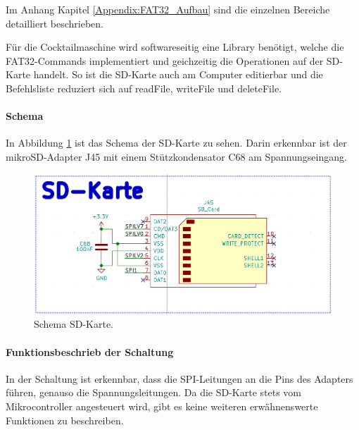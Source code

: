 Im Anhang Kapitel \ref{Appendix:FAT32_Aufbau} sind die einzelnen Bereiche detailliert beschrieben.

Für die Cocktailmaschine wird softwareseitig eine Library benötigt, welche die FAT32-Commands implementiert und geichzeitig die Operationen auf der SD-Karte handelt. So ist die SD-Karte auch am Computer editierbar und die Befehlsliste reduziert sich auf readFile, writeFile und deleteFile.

\paragraph{Schema}\mbox{}

In Abbildung \ref{fig:Schema_SD_Karte} ist das Schema der SD-Karte zu sehen. Darin erkennbar ist der mikroSD-Adapter J45 mit einem Stützkondensator C68 am Spannungseingang.

\begin{figure}[H]
\center
\includegraphics[width = 0.6 \textwidth]{graphics/Schema_SD_Karte}
\caption{Schema SD-Karte.}
\label{fig:Schema_SD_Karte}
\end{figure}

\paragraph{Funktionsbeschrieb der Schaltung}\mbox{}

In der Schaltung ist erkennbar, dass die SPI-Leitungen an die Pins des Adapters führen, genauso die Spannungsleitungen. Da die SD-Karte stets vom Mikrocontroller angesteuert wird, gibt es keine weiteren erwähnenswerte Funktionen zu beschreiben.